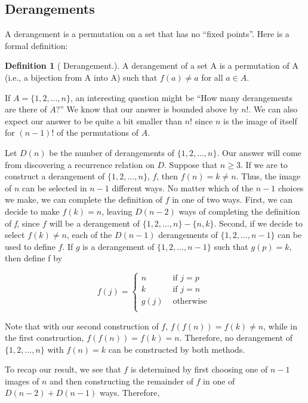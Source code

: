 \documentclass[10pt,]{book}
\theoremstyle{plain}
\theoremstyle{definition}
\newtheorem{definition}[theorem]{Definition}
\theoremstyle{definition}
\theoremstyle{definition}
\theoremstyle{definition}
\numberwithin{equation}{section}
\begin{document}
\subsection[Derangements]{Derangements}\label{ss-derangements}
A derangement is a permutation on a set that has no ``fixed points''.  Here is a formal definition:%
\begin{definition}[ Derangement.]\label{def-derangement.}
A derangement of a set A is a permutation of A (i.e., a bijection from A into A) such that \(f(a)\neq a\) for all \(a \in  A\).%
\end{definition}
\par
 If \(A = \{1, 2, . . . , n\}\), an interesting question might be ``How many derangements are there of \(A\)?''  We know that our answer is bounded above by \(n!\). We can also expect our answer to be quite a bit smaller than \(n!\) since \(n\) is the image of itself for \((n-1)!\) of the permutations of \(A\).%
\par
Let \(D(n)\) be the number of derangements of \(\{1, 2, . . . , n\}\). Our answer will come from discovering a recurrence relation on \(D\). Suppose that \(n \geq  3\). If we are to construct a derangement of \(\{1, 2, \dots , n\}\), \(f\), then \(f(n) = k \neq n\). Thus, the
image of \(n\) can be selected in \(n-1\) different ways. No matter which of the \(n -1\) choices we make, we can complete the definition of
\(f\) in one of two ways. First, we can decide to make \(f(k) = n\), leaving \(D(n -2)\) ways of completing the definition of \textit{
f}, since \(f\) will be a derangement of \(\{1, 2, \dots ,n\} - \{n, k\}\). Second, if we decide to select \(f(k)\neq  n\), each of the
\(D(n - 1)\) derangements of \(\{1, 2,\dots ,n-1\}\) can be used to define \(f\). If \(g\) is a derangement of \(\{1, 2, \dots , n-1\}\) such that \(g(p) = k\), then define f by

\[f(j)=\left\{
\begin{array}{cc}
 n & \textrm{ if } j = p \\
 k & \textrm{ if } j = n \\
 g(j) & \textrm{ otherwise } \\
\end{array}
\right.\]

%
\par
Note that with our second construction of \(f\), \(f(f(n)) = f(k) \neq  n\), while in the first construction, { }\(f(f(n)) = f(k) = n\). Therefore,
no derangement of \(\{1, 2, . . . , n\}\) with \(f(n) = k\) can be constructed by both methods.%
\par
To recap our result, we see that \(f\) is determined by first choosing one of \(n - 1\) images of \(n\) and then constructing the
remainder of \(f\) in one of \(D(n - 2) + D(n -1)\) ways. Therefore,
\end{document}
